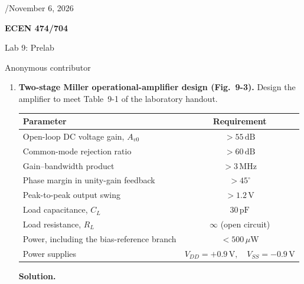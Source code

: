 \documentclass[12pt,letterpaper]{article}
\newcommand{\uW}{\,\mu\mathrm{W}}
\newcommand{\V}{\,\mathrm{V}}
\newcommand{\MHz}{\,\mathrm{MHz}}
\newcommand{\pF}{\,\mathrm{pF}}
\begin{document}
{\fontsize{11}{12.65}\selectfont
\hfill /November 6, 2026\par}
{\centering
{\fontsize{14}{16.1}\selectfont\sffamily\bfseries ECEN 474/704\par}
{\fontsize{14}{16.1}\selectfont Lab 9: Prelab\par}
{\fontsize{14}{16.1}\selectfont Anonymous contributor\par}
}
\vspace{12pt}
\begin{enumerate}

\item \textbf{Two-stage Miller operational-amplifier design (Fig.~9-3).}
Design the amplifier to meet Table~9-1 of the laboratory handout.
\begin{center}
\small
\begin{tabular}{@{}lc@{}}
\toprule
Parameter & Requirement\\
\midrule
Open-loop DC voltage gain, $A_{v0}$ & $>55\,\mathrm{dB}$\\
Common-mode rejection ratio & $>60\,\mathrm{dB}$\\
Gain--bandwidth product & $>3\MHz$\\
Phase margin in unity-gain feedback & $>45^\circ$\\
Peak-to-peak output swing & $>1.2\V$\\
Load capacitance, $C_L$ & $30\pF$\\
Load resistance, $R_L$ & $\infty$ (open circuit)\\
Power, including the bias-reference branch & $<500\uW$\\
Power supplies & $V_{DD}=+0.9\V,\quad V_{SS}=-0.9\V$\\
\bottomrule
\end{tabular}
\end{center}

\textbf{Solution.}


\end{enumerate}
\end{document}
